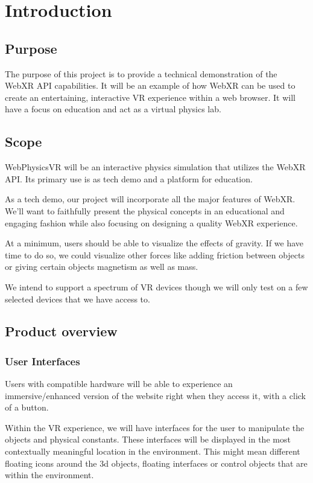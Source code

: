 \section{Introduction}
\subsection{Purpose}
The purpose of this project is to provide a technical demonstration of the WebXR API capabilities. It will be an example of how WebXR can be used to create an entertaining, interactive VR experience within a web browser. It will have a focus on education and act as a virtual physics lab.

\subsection{Scope}
WebPhysicsVR will be an interactive physics simulation that utilizes the WebXR API. Its primary use is as tech demo and a platform for education.

As a tech demo, our project will incorporate all the major features of WebXR. We'll want to faithfully present the physical concepts in an educational and engaging fashion while also focusing on designing a quality WebXR experience.  

At a minimum, users should be able to visualize the effects of gravity.  If we have time to do so, we could visualize other forces like adding friction between objects or giving certain objects magnetism as well as mass.  

We intend to support a spectrum of VR devices though we will only test on a few selected devices that we have access to.
\subsection{Product overview}
\subsubsection{User Interfaces}
Users with compatible hardware will be able to experience an immersive/enhanced version of the website right when they access it, with a click of a button.

Within the VR experience, we will have interfaces for the user to manipulate the objects and physical constants. These interfaces will be displayed in the most contextually meaningful location in the environment.  This might mean different floating icons around the 3d objects, floating interfaces or control objects that are within the environment.

